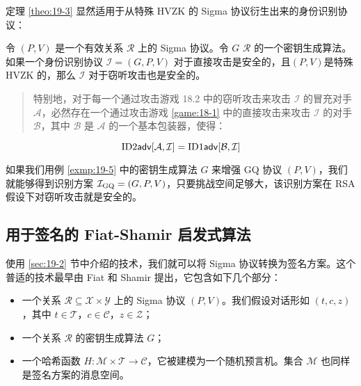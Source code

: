 定理 \ref{theo:19-3} 显然适用于从特殊 HVZK 的 Sigma 协议衍生出来的身份识别协议：

\begin{theorem}\label{theo:19-15}
令 $(P,V)$ 是一个有效关系 $\mathcal{R}$ 上的 Sigma 协议。令 $G$ $\mathcal{R}$ 的一个密钥生成算法。如果一个身份识别协议 $\mathcal{I}=(G,P,V)$ 对于直接攻击是安全的，且$(P,V)$是特殊 HVZK 的，那么 $\mathcal{I}$ 对于窃听攻击也是安全的。
\begin{quote}
特别地，对于每一个通过攻击游戏 18.2 中的窃听攻击来攻击 $\mathcal{I}$ 的冒充对手 $\mathcal{A}$，必然存在一个通过攻击游戏 \ref{game:18-1} 中的直接攻击来攻击 $\mathcal{I}$ 的对手 $\mathcal{B}$，其中 $\mathcal{B}$ 是 $\mathcal{A}$ 的一个基本包装器，使得：
\end{quote}
$$
{\rm ID2\mathsf{adv}}[\mathcal{A},\mathcal{I}]=
{\rm ID1\mathsf{adv}}[\mathcal{B},\mathcal{I}]
$$
\end{theorem}

\begin{example}\label{exmp:19-6}
如果我们用例 \ref{exmp:19-5} 中的密钥生成算法 $G$ 来增强 GQ 协议 $(P,V)$，我们就能够得到识别方案 $\mathcal{I}_{\rm GQ}=(G,P,V)$，只要挑战空间足够大，该识别方案在 RSA 假设下对窃听攻击就是安全的。
\end{example}

\subsection{用于签名的 Fiat-Shamir 启发式算法}\label{subsec:19-6-1}

使用 \ref{sec:19-2} 节中介绍的技术，我们就可以将 Sigma 协议转换为签名方案。这个普适的技术最早由 Fiat 和 Shamir 提出，它包含如下几个部分：
\begin{itemize}
	\item 一个关系 $\mathcal{R}\subseteq\mathcal{X}×\mathcal{Y}$ 上的 Sigma 协议 $(P,V)$。我们假设对话形如 $(t,c,z)$，其中 $t\in\mathcal{T}$，$c\in\mathcal{C}$，$z\in\mathcal{Z}$；
	\item 一个关系 $\mathcal{R}$ 的密钥生成算法 $G$；
	\item 一个哈希函数 $H:\mathcal{M}\times\mathcal{T}\to\mathcal{C}$，它被建模为一个随机预言机。集合 $\mathcal{M}$ 也同样是签名方案的消息空间。
\end{itemize}

